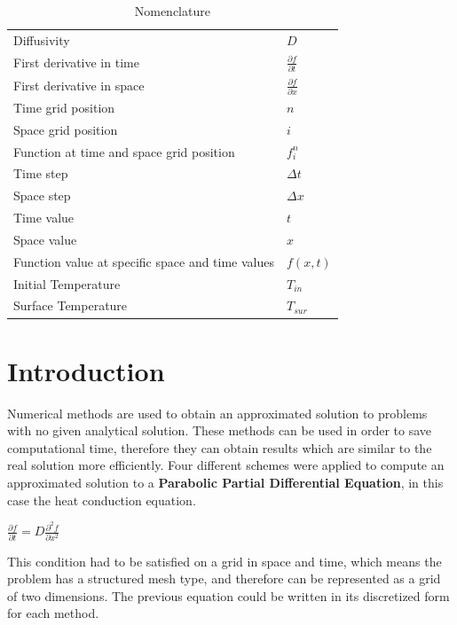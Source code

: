 \documentclass[12pt]{report}
\begin{document}
\begin{table}[tb]
\caption{Nomenclature}
\label{tab:notation}
\centering
\def\arraystretch{1.5}
\begin{tabular}{ll}
Diffusivity & $D$\\
First derivative in time & $\frac{\partial f}{\partial t}$\\
First derivative in space & $\frac{\partial f}{\partial x}$\\
Time grid position & $n$\\
Space grid position & $i$\\
Function at time and space grid position & $f_i^n$\\
Time step & $\Delta t$\\
Space step & $\Delta x$\\
Time value & $t$\\
Space value & $x$\\
Function value at specific space and time values& $f(x, t)$\\
Initial Temperature& $T_{in}$\\
Surface Temperature& $T_{sur}$\\
\end{tabular}
\end{table}


\section*{Introduction}
Numerical methods are used to obtain an approximated solution to problems with no given analytical solution. These methods can be used in order to save computational time, therefore they can obtain results which are similar to the real solution more efficiently. Four different schemes were applied to compute an approximated solution to a \textbf{Parabolic Partial Differential Equation}, in this case the heat conduction equation. 
\begin{center}
\Large
$
\frac{\partial f}{\partial t} = D\frac{\partial ^2 f}{\partial x^2} 
$
\end{center}
\par 
This condition had to be satisfied on a grid in space and time, which means the problem has a structured mesh type, and therefore can be represented as a grid of two dimensions. The previous equation could be written in its discretized form for each method.
\end{document}
